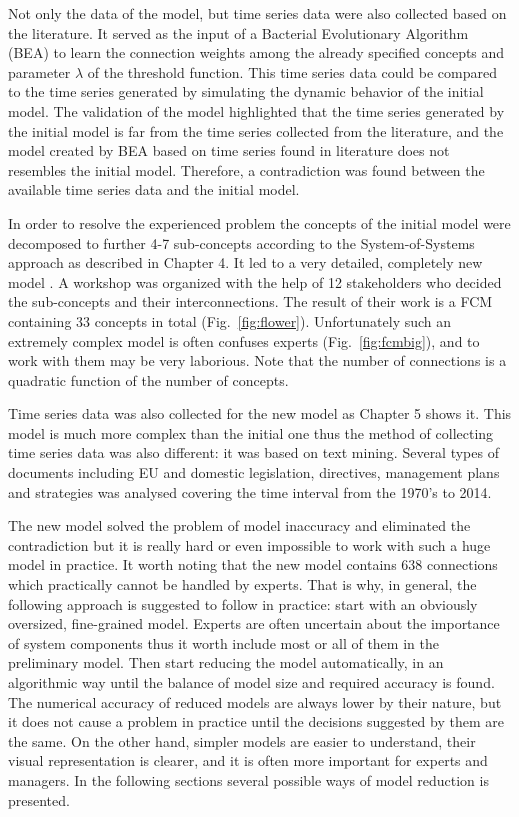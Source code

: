 \documentclass[graybox]{svmult}
\begin{document}
Not only the data of the model, but time series data were also collected based on the literature. It served as the input of a Bacterial Evolutionary Algorithm (BEA) to learn the connection weights among the already specified concepts and parameter $\lambda$ of the threshold function. This time series data could be compared to the time series generated by simulating the dynamic behavior of the initial model. The validation of the model highlighted \cite{buruzs2013advanced} that the time series generated by the initial model is far from the time series collected from the literature, and the model created by BEA based on time series found in literature does not resembles the initial model. Therefore, a contradiction was found between the available time series data and the initial model.

In order to resolve the experienced problem the concepts of the initial model were decomposed to further 4-7 sub-concepts according to the System-of-Systems approach as described in Chapter 4. It led to a very detailed, completely new model \cite{buruzs2013modeling}. A workshop was organized with the help of 12 stakeholders who decided the sub-concepts and their interconnections. The result of their work is a FCM containing 33 concepts in total (Fig.~\ref{fig:flower}). Unfortunately such an extremely complex model is often confuses experts (Fig.~\ref{fig:fcmbig}), and to work with them may be very laborious. Note that the number of connections is a quadratic function of the number of concepts.

Time series data was also collected for the new model as Chapter 5 shows it. This model is much more complex than the initial one thus the method of collecting time series data was also different: it was based on text mining. Several types of documents including EU and domestic legislation, directives, management plans and strategies was analysed covering the time interval from the 1970's to 2014.

The new model solved the problem of model inaccuracy and eliminated the contradiction but it is really hard or even impossible to work with such a huge model in practice. It worth noting that the new model contains 638 connections which practically cannot be handled by experts. That is why, in general, the following approach is suggested to follow in practice: start with an obviously oversized, fine-grained model. Experts are often uncertain about the importance of system components thus it worth include most or all of them in the preliminary model. Then start reducing the model automatically, in an algorithmic way until the balance of model size and required accuracy is found. The numerical accuracy of reduced models are always lower by their nature, but it does not cause a problem in practice until the decisions suggested by them are the same. On the other hand, simpler models are easier to understand, their visual representation is clearer, and it is often more important for experts and managers. In the following sections several possible ways of model reduction is presented.
\end{document}
